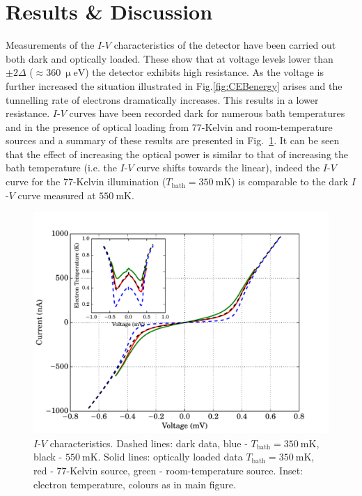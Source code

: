 \documentclass[journal, a4paper]{IEEEtran}
\begin{document}
\section{Results \& Discussion}
Measurements of the $I$-$V$ characteristics of the detector have been carried out both dark and optically loaded. These show that at voltage levels lower than $\pm 2\varDelta$ ($\approx 360~\mathrm{\upmu eV}$) the detector exhibits high resistance. As the voltage is further increased the situation illustrated in Fig.\ref{fig:CEBenergy} arises and the tunnelling rate of electrons dramatically increases. This results in a  lower resistance. $I$-$V$ curves have been recorded dark for numerous bath temperatures and in the presence of optical loading from 77-Kelvin and room-temperature sources and a summary of these results are presented in Fig.~\ref{fig:IV}. It can be seen that the effect of increasing the optical power is similar to that of increasing the bath temperature (i.e. the $I$-$V$ curve shifts towards the linear), indeed the $I$-$V$ curve for the 77-Kelvin illumination ($T_{\mathrm{bath}} = 350~\mathrm{mK}$) is comparable to the dark $I$-$V$ curve measured at $550~\mathrm{mK}$.
\begin{figure}[htb]
\begin{center}
\includegraphics[width=0.9\columnwidth]{IVs}
\caption{$I$-$V$ characteristics. Dashed lines: dark data, blue - $T_{\mathrm{bath}} = 350~\mathrm{mK}$, black - $550~\mathrm{mK}$. Solid lines: optically loaded data $T_{\mathrm{bath}} = 350~\mathrm{mK}$, red - 77-Kelvin source, green - room-temperature source. Inset: electron temperature, colours as in main figure.}
\label{fig:IV}
\end{center}
\end{figure}
\end{document}
